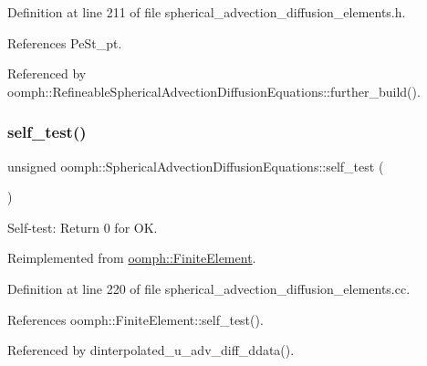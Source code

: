 Definition at line 211 of file spherical\+\_\+advection\+\_\+diffusion\+\_\+elements.\+h.



References Pe\+St\+\_\+pt.



Referenced by oomph\+::\+Refineable\+Spherical\+Advection\+Diffusion\+Equations\+::further\+\_\+build().

\mbox{\label{classoomph_1_1SphericalAdvectionDiffusionEquations_a058fcdc912959c322e704d82d33cde6c}} 
\subsubsection{\texorpdfstring{self\+\_\+test()}{self\_test()}}
{\footnotesize\ttfamily unsigned oomph\+::\+Spherical\+Advection\+Diffusion\+Equations\+::self\+\_\+test (\begin{DoxyParamCaption}{ }\end{DoxyParamCaption})\hspace{0.3cm}{\ttfamily [virtual]}}



Self-\/test\+: Return 0 for OK. 



Reimplemented from \hyperlink{classoomph_1_1FiniteElement_af94c5a5e22175d5420b33b3b79e46ed3}{oomph\+::\+Finite\+Element}.



Definition at line 220 of file spherical\+\_\+advection\+\_\+diffusion\+\_\+elements.\+cc.



References oomph\+::\+Finite\+Element\+::self\+\_\+test().



Referenced by dinterpolated\+\_\+u\+\_\+adv\+\_\+diff\+\_\+ddata().

\mbox{\label{classoomph_1_1SphericalAdvectionDiffusionEquations_a9895841883dedbbc00fb1fc51ad0493e}} 
